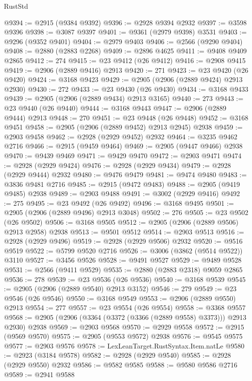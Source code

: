 \begin{lexlean}{RustStd}
\begin{coremodule}
{\begin{coremodule}
{{{{{{{{{{{{{{{{{{{{{{{{{{{{{{{{{{{{{{{{{{{{{{{{{{{{{{{{{{{{{{{{{{{{{{{{{{{{{{@9394 := @2915 (@9384 @9392)
@9396 := @2928 @9394 @2932
@9397 := @3598 @9396
@9398 := @3087 @9397
@9401 := @9361 (@2979 @9398) @3531
@9403 := @9296 (@9352 @9401)
@9404 := @2979 @9403
@9406 := @2566 (@9290 @9404)
@9408 := @2880 (@2883 @2268)
@9409 := @2896 @4625
@9411 := @9408 @9409 @2865
@9412 := 274
@9415 := @23 @9412 (@26 @9412)
@9416 := @2908 @9415
@9419 := @2906 (@2889 @9416) @2913
@9420 := 271
@9423 := @23 @9420 (@26 @9420)
@9424 := @3168 @9423
@9429 := @2905 (@2906 (@2889 @9424) @2913 @2930)
@9430 := 272
@9433 := @23 @9430 (@26 @9430)
@9434 := @3168 @9433
@9439 := @2905 (@2906 (@2889 @9434) @2913 @3165)
@9440 := 273
@9443 := @23 @9440 (@26 @9440)
@9444 := @3168 @9443
@9447 := @2906 (@2889 @9444) @2913
@9448 := 270
@9451 := @23 @9448 (@26 @9448)
@9452 := @3168 @9451
@9458 := @2905 (@2906 (@2889 @9452) @2913 @2945) @2938
@9459 := @2903 @9458
@9462 := @2928 (@2929 @9452) @2932
@9464 := @3235 @9462 @2716
@9466 := @2915 (@9459 @9464)
@9469 := @2905 (@9447 @9466) @2938
@9470 := @9439 @9469
@9471 := @9429 @9470
@9472 := @2903 @9471
@9474 := @2928 (@2929 @9424)
@9476 := @2928 (@2929 @9434)
@9479 := @2928 (@2929 @9444) @2932
@9480 := @9476 @9479
@9481 := @9474 @9480
@9483 := @3836 @9481 @2716
@9485 := @2915 (@9472 @9483)
@9488 := @2905 (@9419 @9485) @2938
@9489 := @2903 @9488
@9491 := @3002 (@2929 @9416)
@9492 := 275
@9495 := @23 @9492 (@26 @9492)
@9496 := @3168 @9495
@9501 := @2905 (@2906 (@2889 @9496) @2913 @3048)
@9502 := 276
@9505 := @23 @9502 (@26 @9502)
@9506 := @3168 @9505
@9512 := @2905 (@2906 (@2889 @9506) @2913 @2958) @2938
@9513 := @9501 @9512
@9514 := @2903 @9513
@9516 := @2928 (@2929 @9496)
@9519 := @2928 (@2929 @9506) @2932
@9520 := @9516 @9519
@9522 := @5799 @9520 @2716
@9526 := @3006 (@3862 (@9514 @9522)) @3110
@9527 := @3456 @9526
@9528 := @9491 @9527
@9529 := @9489 @9528
@9531 := @2566 (@9411 @9529)
@9535 := @2880 (@2883 @2318) @9059 @2865
@9536 := 278
@9539 := @23 @9536 (@26 @9536)
@9540 := @3168 @9539
@9545 := @2905 (@2906 (@2889 @9540) @2913 @3152)
@9546 := 279
@9549 := @23 @9546 (@26 @9546)
@9550 := @3168 @9549
@9553 := @2906 (@2889 @9550) @2913
@9554 := 277
@9557 := @23 @9554 (@26 @9554)
@9558 := @3368 @9557
@9568 := @2905 (@2906 (@3364 (@3372 (@3366 (@2889 @9558) @3373))) @2913 @2930) @2938
@9569 := @2903 @9568
@9570 := @2929 @9558
@9572 := @2915 (@9569 @9570)
@9575 := @2905 (@9553 @9572) @2938
@9576 := @9545 @9575
@9577 := @2903 @9576
@9578 := LexLeanTarget.RustSyntax.Item.natLe
@9580 := @2923 (@3184 @9578)
@9582 := @2928 (@2929 @9540)
@9585 := @2928 (@2929 @9550) @2932
@9586 := @9582 @9585
@9588 := @9580 @9586 @2716
@9589 := @2941 @9588
}}}}}}}}}}}}}}}}}}}}}}}}}}}}}}}}}}}}}}}}}}}}}}}}}}}}}}}}}}}}}}}}}}}}}}}}}}}}}}
\end{coremodule}}
\end{coremodule}
\end{lexlean}
